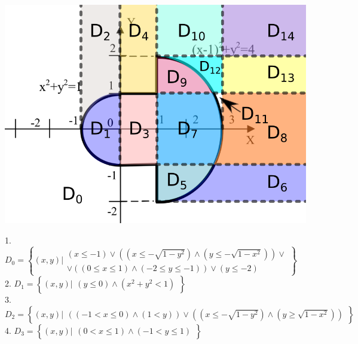 \documentclass[14pt,a4paper]{scrartcl}
\theoremstyle{definition}
\theoremstyle{remark}
\theoremstyle{definition}
\theoremstyle{definition}
\begin{document}
\begin{center} \includegraphics[scale=0.5]{assets/fixobl0.png}
\end{center}
1. $D_0 = \left\lbrace (x,y) \Bigg| \begin{gathered}
 (x\leq -1)  \lor \left( (x \leq  -\sqrt{1 - y^2}) \land (y \leq  -\sqrt{1-x^2}) \right) \lor \\
 \lor \left( (0 \leq x \leq 1 )\land ( -2  \leq y \leq -1) \right) \lor (y \leq -2)
\end{gathered} \right\rbrace $\\
2. $D_1 = \left\lbrace (x,y) \big| \begin{gathered}
(y\leq 0) \land (x^2 + y^2 < 1)
\end{gathered} \right\rbrace $\\
3.  $D_2 = \left\lbrace (x,y) \big| \begin{gathered}
\left( (-1<x\leq 0) \land (1<y) \right)
\lor \left( (x \leq  -\sqrt{1 - y^2}) \land (y \geq   \sqrt{1-x^2}) \right)
\end{gathered} \right\rbrace $\\
4.  $D_3 = \left\lbrace (x,y) \big| \begin{gathered}
( 0 < x \leq 1) \land (-1 < y \leq 1)
\end{gathered} \right\rbrace $\\
\end{document}
